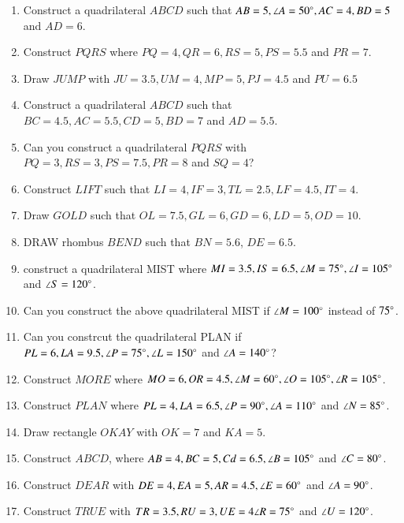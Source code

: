 \renewcommand{\theequation}{\theenumi}
\begin{enumerate}[label=\thesection.\arabic*.,ref=\thesection.\theenumi]


\item Construct a quadrilateral $ABCD$ such that $AB=5, \angle A = 50\degree, AC = 4, BD = 5$ and $AD = 6$.
\item Construct $PQRS$ where $PQ = 4, QR = 6, RS = 5, PS = 5.5$ and $PR = 7$.
\item Draw $JUMP$ with $JU = 3.5, UM=4, MP = 5, PJ =4.5$ and $PU = 6.5$
\item Construct a quadrilateral $ABCD$ such that $BC=4.5,  AC = 5.5, CD = 5, BD = 7$ and $AD = 5.5$.
\item Can you construct a quadrilateral $PQRS$ with $PQ=3, RS=3, PS=7.5, PR=8$ and $SQ=4$?
\item Construct $LIFT$ such that $LI = 4, IF = 3, TL = 2.5, LF = 4.5, IT=4$.
\item Draw $GOLD$ such that $OL=7.5, GL=6, GD=6, LD = 5, OD = 10$.
\item DRAW rhombus $BEND$ such that $BN = 5.6$, $DE = 6.5$.
\item construct a quadrilateral MIST where $MI = 3.5, IS = 6.5, \angle M = 75 \degree, \angle I = 105 \degree$ and $\angle S = 120 \degree$.
\item Can you construct the above quadrilateral MIST if $\angle M = 100 \degree$ instead of $75 \degree$.
\item Can you constrcut the quadrilateral PLAN if $PL = 6, LA = 9.5, \angle P = 75 \degree, \angle L = 150 \degree$ and $\angle A = 140 \degree$?
\item Construct $MORE$ where $MO = 6, OR = 4.5, \angle M = 60 \degree, \angle O = 105 \degree, \angle R = 105 \degree$.
\item Construct $PLAN$ where $PL = 4, LA = 6.5, \angle P = 90 \degree, \angle A = 110\degree$ and $\angle N = 85\degree$.
\item Draw  rectangle $OKAY$ with $OK = 7$ and $KA = 5$.
\item Construct $ABCD $, where $AB = 4, BC = 5, Cd = 6.5, \angle B = 105 \degree$ and $\angle C = 80\degree$.
\item Construct $DEAR$ with $DE = 4, EA = 5, AR = 4.5, \angle E = 60 \degree$ and $\angle A = 90 \degree$.\item Construct $TRUE$ with $TR = 3.5, RU = 3, UE = 4 \angle R = 75\degree$ and $\angle U = 120\degree$.


\end{enumerate}
